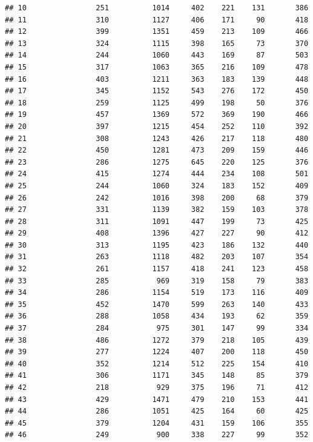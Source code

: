 \documentclass[]{book}
\begin{document}
\begin{verbatim}
## 10                251          1014     402    221    131       386
## 11                310          1127     406    171     90       418
## 12                399          1351     459    213    109       466
## 13                324          1115     398    165     73       370
## 14                244          1060     443    169     87       503
## 15                317          1063     365    216    109       478
## 16                403          1211     363    183    139       448
## 17                345          1152     543    276    172       450
## 18                259          1125     499    198     50       376
## 19                457          1369     572    369    190       466
## 20                397          1215     454    252    110       392
## 21                308          1243     426    217    118       480
## 22                450          1281     473    209    159       446
## 23                286          1275     645    220    125       376
## 24                415          1274     444    234    108       501
## 25                244          1060     324    183    152       409
## 26                242          1016     398    200     68       379
## 27                331          1139     382    159    103       378
## 28                311          1091     447    199     73       425
## 29                408          1396     427    227     90       412
## 30                313          1195     423    186    132       440
## 31                263          1118     482    203    107       354
## 32                261          1157     418    241    123       458
## 33                285           969     319    158     79       383
## 34                286          1154     519    173    116       409
## 35                452          1470     599    263    140       433
## 36                288          1058     434    193     62       359
## 37                284           975     301    147     99       334
## 38                486          1272     379    218    105       439
## 39                277          1224     407    200    118       450
## 40                352          1214     512    225    154       410
## 41                306          1171     345    148     85       379
## 42                218           929     375    196     71       412
## 43                429          1471     479    210    153       441
## 44                286          1051     425    164     60       425
## 45                379          1204     431    159    106       355
## 46                249           900     338    227     99       352

\end{verbatim}
\end{document}
